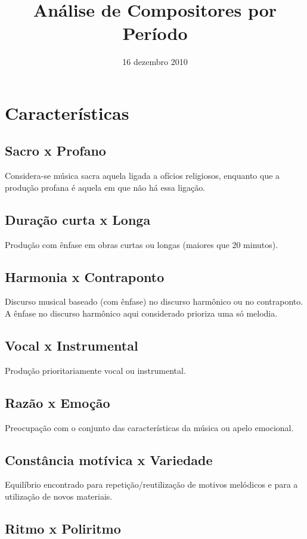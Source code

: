 \documentclass[11pt]{article}
\title{Análise de Compositores por Período}
\author{}
\date{16 dezembro 2010}
\begin{document}
\maketitle


\section{Características}
\label{sec-1}
\subsection{Sacro x Profano}
\label{sec-1_1}

Considera-se música sacra aquela ligada a ofícios religiosos, enquanto que a produção profana é aquela em que não há essa ligação. 
\subsection{Duração curta x Longa}
\label{sec-1_2}

Produção com ênfase em obras curtas ou longas (maiores que 20 minutos).
\subsection{Harmonia x Contraponto}
\label{sec-1_3}

Discurso musical baseado (com ênfase) no discurso harmônico ou
no contraponto. A ênfase no discurso harmônico aqui
considerado prioriza uma só melodia.
\subsection{Vocal x Instrumental}
\label{sec-1_4}

Produção prioritariamente vocal ou instrumental.
\subsection{Razão x Emoção}
\label{sec-1_5}

Preocupação com o conjunto das características da música ou apelo emocional.
\subsection{Constância motívica x Variedade}
\label{sec-1_6}

Equilíbrio encontrado para repetição/reutilização de motivos melódicos e para
a utilização de novos materiais.
\subsection{Ritmo x Poliritmo}
\label{sec-1_7}
\end{document}
